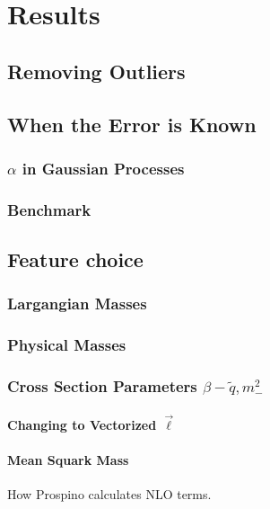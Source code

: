 \documentclass[twoside,english]{uiofysmaster}
\begin{document}
\chapter{Results}

\section{Removing Outliers}

\section{When the Error is Known}

\subsection{$\alpha$ in Gaussian Processes}

\subsection{Benchmark}

\section{Feature choice}

\subsection{Largangian Masses}

\subsection{Physical Masses}

\subsection{Cross Section Parameters $\beta-{\tilde{q}}, m_-^2$}

\subsubsection{Changing to Vectorized $\vec{\ell}$}

\subsubsection{Mean Squark Mass}

How Prospino calculates NLO terms.
\end{document}
